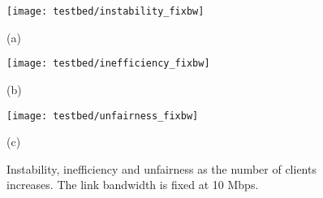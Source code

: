 \documentclass[conference]{IEEEtran}
\theoremstyle{plain}
\theoremstyle{definition}
\theoremstyle{plain}
\theoremstyle{plain}
\begin{document}
\begin{figure*}
\begin{centering}
\begin{minipage}[t]{0.66\columnwidth}\begin{center}
\texttt{[image: testbed/instability\_fixbw]}
\par\end{center}

\begin{center}
\vspace{-0.1in}
(a) 
\par\end{center}\end{minipage} \begin{minipage}[t]{0.66\columnwidth}\begin{center}
\texttt{[image: testbed/inefficiency\_fixbw]}
\par\end{center}

\begin{center}
\vspace{-0.1in}
(b) 
\par\end{center}\end{minipage} \begin{minipage}[t]{0.66\columnwidth}\begin{center}
\texttt{[image: testbed/unfairness\_fixbw]}
\par\end{center}

\begin{center}
\vspace{-0.1in}
(c) 
\par\end{center}\end{minipage} 
\par\end{centering}

\vspace{-0.01in}

\caption{Instability, inefficiency and unfairness as the number of clients
increases. The link bandwidth is fixed at 10 Mbps.}


\label{Flo:fixbw} \vspace{-0.05in}
\end{figure*}
\end{document}
